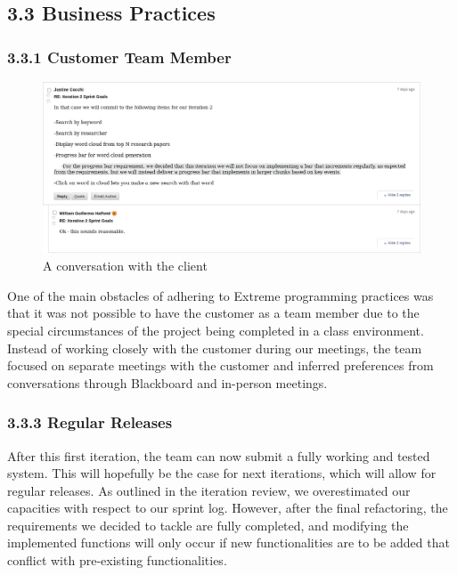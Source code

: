 \documentclass[]{article}
\begin{document}
\subsection{3.3 Business Practices}\label{business-practices}

\subsubsection{3.3.1 Customer Team Member}\label{customer-team-member}


\begin{figure}[htbp]
\centering
\includegraphics{images/conv_client.png}
\caption{A conversation with the client}
\end{figure}

One of the main obstacles of adhering to Extreme programming practices
was that it was not possible to have the customer as a team member due
to the special circumstances of the project being completed in a class
environment. Instead of working closely with the customer during our
meetings, the team focused on separate meetings with the customer and
inferred preferences from conversations through Blackboard and in-person
meetings. 

\subsubsection{3.3.3 Regular Releases}\label{regular-releases}

After this first iteration, the team can now submit a fully working and
tested system. This will hopefully be the case for next iterations,
which will allow for regular releases. As outlined in the iteration
review, we overestimated our capacities with respect to our sprint log.
However, after the final refactoring, the requirements we decided to
tackle are fully completed, and modifying the implemented functions will
only occur if new functionalities are to be added that conflict with
pre-existing functionalities.
\end{document}
